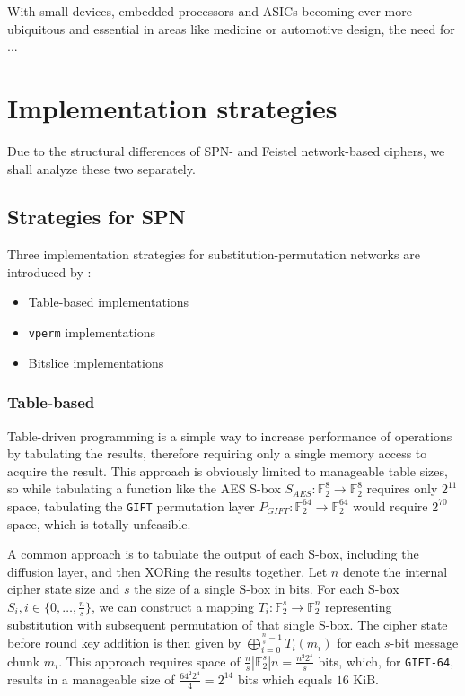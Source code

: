 \documentclass[12pt]{report}
\newcommand{\F}[1]{\mathbb{F}_2^{#1}}
\begin{document}
With small devices, embedded processors and ASICs becoming ever more ubiquitous
and essential in areas like medicine or automotive design, the need for ...

\chapter{Implementation strategies}

Due to the structural differences of SPN- and Feistel network-based ciphers, we
shall analyze these two separately.

\section{Strategies for SPN}

Three implementation strategies for substitution-permutation networks are
introduced by \cite{implx86:2014}:

\begin{itemize}
    \item Table-based implementations
    \item \texttt{vperm} implementations
    \item Bitslice implementations
\end{itemize}

\subsection{Table-based}

Table-driven programming is a simple way to increase performance of operations
by tabulating the results, therefore requiring only a single memory access to
acquire the result. This approach is obviously limited to manageable table
sizes, so while tabulating a function like the AES S-box
$S_{AES}:\F{8}\rightarrow \F{8}$ requires only $2^{11}$ space,
tabulating the \texttt{GIFT} permutation layer
$P_{GIFT}:\F{64}\rightarrow \F{64}$ would require
$2^{70}$ space, which is totally unfeasible.

A common approach is to tabulate the output of each S-box, including the
diffusion layer, and then XORing the results together. Let $n$ denote the
internal cipher state size and $s$ the size of a single S-box in bits. For each
S-box $S_i,i\in\{0,\dots,\frac{n}{s}\}$, we can construct a mapping
$T_i:\F{s}\rightarrow \F{n}$ representing substitution with subsequent
permutation of that single S-box. The cipher state before round key addition is
then given by $\bigoplus_{i=0}^{\frac{n}{s}-1}{T_i(m_i)}$ for each $s$-bit
message chunk $m_i$. This approach requires space of
$\frac{n}{s}|\F{s}|n=\frac{n^2 2^s}{s}$ bits, which, for \texttt{GIFT-64},
results in a manageable size of $\frac{64^2 2^4}{4}=2^{14}$ bits which equals
$16$ KiB.
\end{document}

